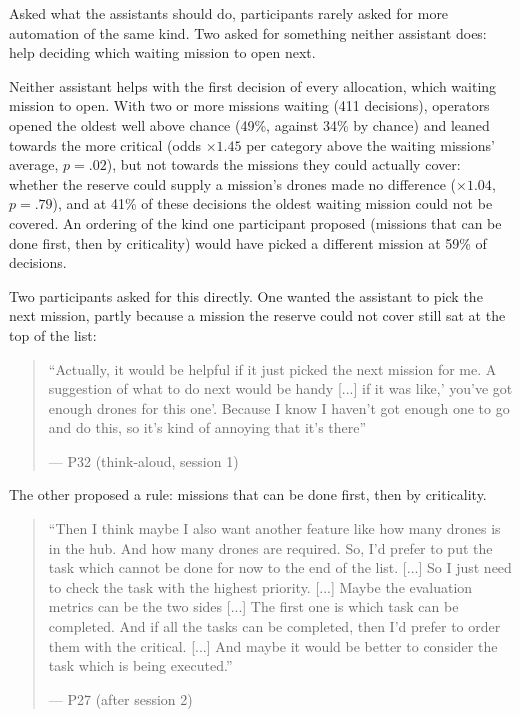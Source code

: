 Asked what the assistants should do, participants rarely asked for more automation of the same kind. Two asked for something neither assistant does: help deciding which waiting mission to open next.

\label{sec:qual:new-jobs:queue-order}
Neither assistant helps with the first decision of every allocation, which waiting mission to open. With two or more missions waiting (411 decisions), operators opened the oldest well above chance (49\%, against 34\% by chance) and leaned towards the more critical (odds $\times 1.45$ per category above the waiting missions' average, $p = .02$), but not towards the missions they could actually cover: whether the reserve could supply a mission's drones made no difference ($\times 1.04$, $p = .79$), and at 41\% of these decisions the oldest waiting mission could not be covered. An ordering of the kind one participant proposed (missions that can be done first, then by criticality) would have picked a different mission at 59\% of decisions.

{\color{blue}Two participants asked for this directly. One wanted the assistant to pick the next mission, partly because a mission the reserve could not cover still sat at the top of the list:}

\begin{quote}\small
``Actually, it would be helpful if it just picked the next mission for me. A suggestion of what to do next would be handy [...] if it was like,' you've got enough drones for this one'. Because I know I haven't got enough one to go and do this, so it's kind of annoying that it's there''\par\hfill--- P32 (think-aloud, session 1)
\end{quote}

{\color{blue}The other proposed a rule: missions that can be done first, then by criticality.}

\begin{quote}\small
``Then I think maybe I also want another feature like how many drones is in the hub. And how many drones are required. So, I'd prefer to put the task which cannot be done for now to the end of the list. [...] So I just need to check the task with the highest priority. [...] Maybe the evaluation metrics can be the two sides [...] The first one is which task can be completed. And if all the tasks can be completed, then I'd prefer to order them with the critical. [...] And maybe it would be better to consider the task which is being executed.''\par\hfill--- P27 (after session 2)
\end{quote}

